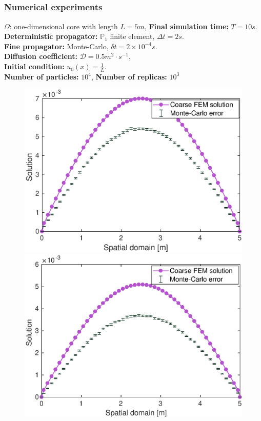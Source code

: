 \documentclass[10 pt]{beamer}
\begin{document}
\subsection{}
\begin{frame}
\frametitle{Numerical experiments}
$\Omega$:  one-dimensional core with length $L = 5 m$, \textbf{Final simulation time:} $T=10 s$.
\\
\vspace{0.2 cm}
\textbf{Deterministic propagator:} $\mathbb{P}_1$ finite element, $\Delta t = 2 s$.
\\
\vspace{0.2 cm}
\textbf{Fine propagator:} Monte-Carlo, $\delta t = 2 \times 10^{-4} s$.
\\
\vspace{0.2 cm}
\textbf{Diffusion coefficient:} $\mathcal{D} = 0.5 m^2 \cdot s^{-1}$, \\
\vspace{0.2 cm}
\textbf{Initial condition:} $u_0(x)=\frac{1}{L}$.
\\
\vspace{0.2 cm}
\textbf{Number of particles:} $10^4$, \textbf{Number of replicas:} $10^3$
\\
\vspace{0.2 cm}
\begin{figure}
  \includegraphics[width= 0.44 \textwidth]{image/Full_MC_coarse_FEM_n=8}
  \hfill
  \includegraphics[width= 0.44 \textwidth]{image/Full_MC_coarse_FEM_n=10}
\end{figure}
\end{frame}
%
\end{document}
